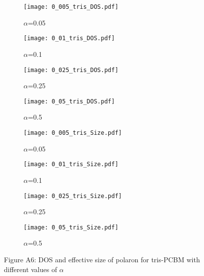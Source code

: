 \documentclass[a4paper,12pt]{article}
\begin{document}
\begin{figure}[H]
\centering
\begin{subfigure}[b]{0.24\textwidth}
\texttt{[image: 0\_005\_tris\_DOS.pdf]}
\caption{$\alpha$=0.05}
\end{subfigure}
\begin{subfigure}[b]{0.24\textwidth}
\texttt{[image: 0\_01\_tris\_DOS.pdf]}
\caption{$\alpha$=0.1}
\end{subfigure}
\begin{subfigure}[b]{0.24\textwidth}
\texttt{[image: 0\_025\_tris\_DOS.pdf]}
\caption{$\alpha$=0.25}
\end{subfigure}
\begin{subfigure}[b]{0.24\textwidth}
\texttt{[image: 0\_05\_tris\_DOS.pdf]}
\caption{$\alpha$=0.5}
\end{subfigure}
\begin{subfigure}[b]{0.24\textwidth}
\texttt{[image: 0\_005\_tris\_Size.pdf]}
\caption{$\alpha$=0.05}
\end{subfigure}
\begin{subfigure}[b]{0.24\textwidth}
\texttt{[image: 0\_01\_tris\_Size.pdf]}
\caption{$\alpha$=0.1}
\end{subfigure}
\begin{subfigure}[b]{0.24\textwidth}
\texttt{[image: 0\_025\_tris\_Size.pdf]}
\caption{$\alpha$=0.25}
\end{subfigure}
\begin{subfigure}[b]{0.24\textwidth}
\texttt{[image: 0\_05\_tris\_Size.pdf]}
\caption{$\alpha$=0.5}
\end{subfigure}
\caption*{Figure A6: DOS and effective size of polaron for tris-PCBM with different values of $\alpha$}
\label{fig:alphatris}
\end{figure}
\end{document}
